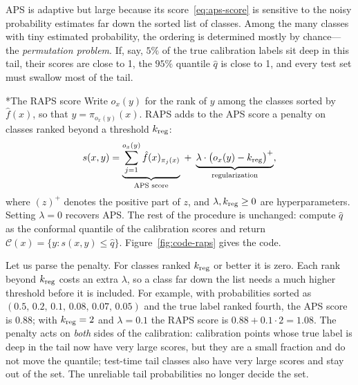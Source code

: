 \documentclass[11pt]{article}
\makeatletter
\theoremstyle{definition}
\renewcommand\subsection{\@startsection{subsection}{2}{\z@}{-3.25ex\@plus -1ex \@minus -.2ex}{1.5ex \@plus .2ex}{\normalfont\large\bfseries\color{secblue}}}
\newcommand{\C}{\mathcal{C}}
\newcommand{\fhat}{\hat{f}}
\newcommand{\qhat}{\hat{q}}
\newcommand{\kreg}{k_{\rm reg}}
\makeatother
\begin{document}
APS is adaptive but large because its score~\eqref{eq:aps-score} is sensitive to the noisy probability estimates far down the sorted list of classes. Among the many classes with tiny estimated probability, the ordering is determined mostly by chance---the \emph{permutation problem}. If, say, $5\%$ of the true calibration labels sit deep in this tail, their scores are close to 1, the $95\%$ quantile $\qhat$ is close to 1, and every test set must swallow most of the tail.

\subsection*{The RAPS score}
Write $o_x(y)$ for the rank of $y$ among the classes sorted by $\fhat(x)$, so that $y=\pi_{o_x(y)}(x)$. RAPS adds to the APS score a penalty on classes ranked beyond a threshold $\kreg$:
\begin{equation}\label{eq:raps-score}
s(x,y)=\underbrace{\sum_{j=1}^{o_x(y)}\fhat(x)_{\pi_j(x)}}_{\text{APS score}}\;+\;\underbrace{\lambda\cdot\big(o_x(y)-\kreg\big)^+}_{\text{regularization}},
\end{equation}
where $(z)^+$ denotes the positive part of $z$, and $\lambda,\kreg\ge0$ are hyperparameters. Setting $\lambda=0$ recovers APS. The rest of the procedure is unchanged: compute $\qhat$ as the conformal quantile of the calibration scores and return $\C(x)=\{y:s(x,y)\le\qhat\}$. Figure~\ref{fig:code-raps} gives the code.

Let us parse the penalty. For classes ranked $\kreg$ or better it is zero. Each rank beyond $\kreg$ costs an extra $\lambda$, so a class far down the list needs a much higher threshold before it is included. For example, with probabilities sorted as $(0.5,\,0.2,\,0.1,\,0.08,\,0.07,\,0.05)$ and the true label ranked fourth, the APS score is $0.88$; with $\kreg=2$ and $\lambda=0.1$ the RAPS score is $0.88+0.1\cdot2=1.08$. The penalty acts on \emph{both} sides of the calibration: calibration points whose true label is deep in the tail now have very large scores, but they are a small fraction and do not move the quantile; test-time tail classes also have very large scores and stay out of the set. The unreliable tail probabilities no longer decide the set.
\end{document}
